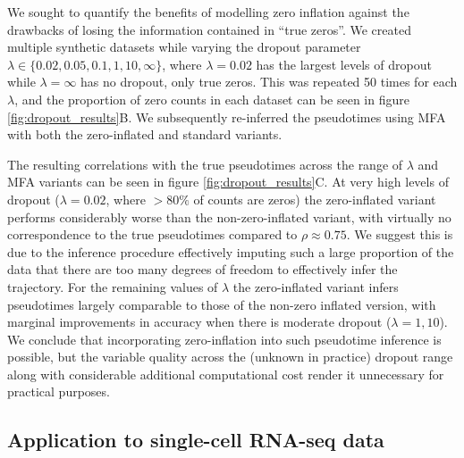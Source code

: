 We sought to quantify the benefits of modelling zero inflation against the drawbacks of losing the information contained in ``true zeros''. We created multiple synthetic datasets while varying the dropout parameter $\lambda \in \{0.02, 0.05, 0.1, 1, 10, \infty\}$, where $\lambda = 0.02$ has the largest levels of dropout while $\lambda = \infty$ has no dropout, only true zeros. This was repeated 50 times for each $\lambda$, and the proportion of zero counts in each dataset can be seen in figure \ref{fig:dropout_results}B. We subsequently re-inferred the pseudotimes using MFA with both the zero-inflated and standard variants.

The resulting correlations with the true pseudotimes across the range of $\lambda$ and MFA variants can be seen in figure \ref{fig:dropout_results}C. At very high levels of dropout ($\lambda = 0.02$, where $>80\%$ of counts are zeros) the zero-inflated variant performs considerably worse than the non-zero-inflated variant, with virtually no correspondence to the true pseudotimes compared to $\rho \approx 0.75$. We suggest this is due to the inference procedure effectively imputing such a large proportion of the data that there are too many degrees of freedom to effectively infer the trajectory. For the remaining values of $\lambda$ the zero-inflated variant infers pseudotimes largely comparable to those of the non-zero inflated version, with marginal improvements in accuracy when there is moderate dropout ($\lambda = 1, 10$). We conclude that incorporating zero-inflation into such pseudotime inference is possible, but the variable quality across the (unknown in practice) dropout range along with considerable additional computational cost render it unnecessary for practical purposes.

\subsection{Application to single-cell RNA-seq data}

